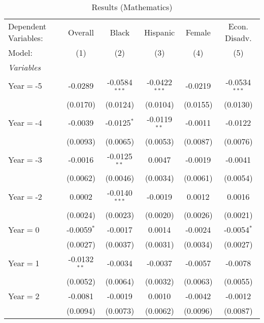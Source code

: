 
\begin{table}[htbp]
   \centering
   \caption{\label{MainResultsMath} Results (Mathematics)}
   \begin{tabular}{lccccc}
      \tabularnewline\midrule\midrule
      Dependent Variables: & Overall        & Black           & Hispanic        & Female   & Econ. Disadv.\\
      Model:               & (1)            & (2)             & (3)             & (4)      & (5)\\
      \midrule \emph{Variables} &   &   &   &   &  \\
      Year$=$-5            & -0.0289        & -0.0584$^{***}$ & -0.0422$^{***}$ & -0.0219  & -0.0534$^{***}$\\
                           & (0.0170)       & (0.0124)        & (0.0104)        & (0.0155) & (0.0130)\\
      Year$=$-4            & -0.0039        & -0.0125$^{*}$   & -0.0119$^{**}$  & -0.0011  & -0.0122\\
                           & (0.0093)       & (0.0065)        & (0.0053)        & (0.0087) & (0.0076)\\
      Year$=$-3            & -0.0016        & -0.0125$^{**}$  & 0.0047          & -0.0019  & -0.0041\\
                           & (0.0062)       & (0.0046)        & (0.0034)        & (0.0061) & (0.0054)\\
      Year$=$-2            & 0.0002         & -0.0140$^{***}$ & -0.0019         & 0.0012   & 0.0016\\
                           & (0.0024)       & (0.0023)        & (0.0020)        & (0.0026) & (0.0021)\\
      Year$=$0             & -0.0059$^{*}$  & -0.0017         & 0.0014          & -0.0024  & -0.0054$^{*}$\\
                           & (0.0027)       & (0.0037)        & (0.0031)        & (0.0034) & (0.0027)\\
      Year$=$1             & -0.0132$^{**}$ & -0.0034         & -0.0037         & -0.0057  & -0.0078\\
                           & (0.0052)       & (0.0064)        & (0.0032)        & (0.0063) & (0.0055)\\
      Year$=$2             & -0.0081        & -0.0019         & 0.0010          & -0.0042  & -0.0012\\
                           & (0.0094)       & (0.0073)        & (0.0062)        & (0.0096) & (0.0087)\\

\end{tabular}
\end{table}
